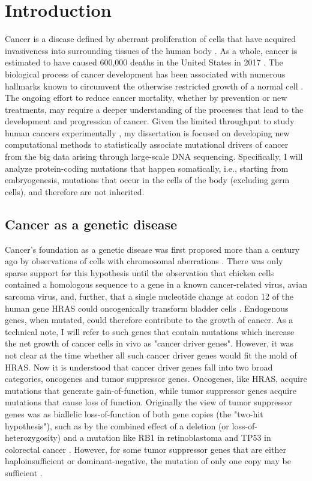 
\chapter{Introduction}
\label{chap:intro}

Cancer is a disease defined by aberrant proliferation of cells that have acquired invasiveness into surrounding tissues of the human body \cite{RN21}. As a whole, cancer is estimated to have caused 600,000 deaths in the United States in 2017 \cite{RN165}. The biological process of cancer development has been associated with numerous hallmarks known to circumvent the otherwise restricted growth of a normal cell \cite{RN24}. The ongoing effort to reduce cancer mortality, whether by prevention or new treatments, may require a deeper understanding of the processes that lead to the development and progression of cancer. Given the limited throughput to study human cancers experimentally \cite{RN61}, my dissertation is focused on developing new computational methods to statistically associate mutational drivers of cancer from the big data arising through large-scale DNA sequencing. Specifically, I will analyze protein-coding mutations that happen somatically, i.e., starting from embryogenesis, mutations that occur in the cells of the body (excluding germ cells), and therefore are not inherited.

\section{Cancer as a genetic disease}
\label{sec:section}

Cancer's foundation as a genetic disease was first proposed more than a century ago by observations of cells with chromosomal aberrations \cite{RN18}. There was only sparse support for this hypothesis until the observation that chicken cells contained a homologous sequence to a gene in a known cancer-related virus, avian sarcoma virus, \cite{RN20} and, further, that a single nucleotide change at codon 12 of the human gene HRAS could oncogenically transform bladder cells \cite{RN21, RN19}. Endogenous genes, when mutated, could therefore contribute to the growth of cancer. As a technical note, I will refer to such genes that contain mutations which increase the net growth of cancer cells in vivo as "cancer driver genes". However, it was not clear at the time whether all such cancer driver genes would fit the mold of HRAS.  Now it is understood that cancer driver genes fall into two broad categories, oncogenes and tumor suppressor genes. Oncogenes, like HRAS, acquire mutations that generate gain-of-function, while tumor suppressor genes acquire mutations that cause loss of function. Originally the view of tumor suppressor genes was as biallelic loss-of-function of both gene copies (the "two-hit hypothesis"\cite{RN22}), such as by the combined effect of a deletion (or loss-of-heterozygosity) and a mutation like RB1 in retinoblastoma \cite{RN23} and TP53 in colorectal cancer \cite{RN1}. However, for some tumor suppressor genes that are either haploinsufficient or dominant-negative, the mutation of only one copy may be sufficient \cite{RN163, RN161, RN162}.

